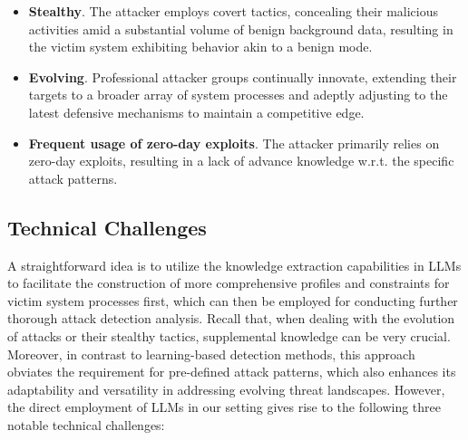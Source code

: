 \begin{itemize}
    \item \textbf{Stealthy}. The attacker employs covert tactics, concealing their malicious activities amid a substantial volume of benign background data, resulting in the victim system exhibiting behavior akin to a benign mode.
    \item \textbf{Evolving}. Professional attacker groups continually innovate, extending their targets to a broader array of system processes and adeptly adjusting to the latest defensive mechanisms to maintain a competitive edge.
    \item \textbf{Frequent usage of zero-day exploits}. The attacker primarily relies on zero-day exploits, resulting in a lack of advance knowledge w.r.t. the specific attack patterns.
\end{itemize}

\subsection{Technical Challenges}\label{sec:challenges}
A straightforward idea is to utilize the knowledge extraction capabilities in LLMs to facilitate the construction of more comprehensive profiles and constraints for victim system processes first, which can then be employed for conducting further thorough attack detection analysis. Recall that,
when dealing with the evolution of attacks or their stealthy tactics, supplemental knowledge can be very crucial. Moreover, in contrast to learning-based detection methods, this approach obviates the requirement for pre-defined attack patterns, which also enhances its adaptability and versatility in addressing evolving threat landscapes.
However, the direct employment of LLMs in our setting gives rise to the following three notable technical challenges:


